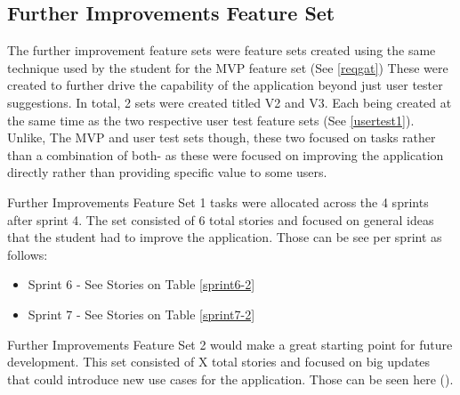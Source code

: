 \subsection{Further Improvements Feature Set}
The further improvement feature sets were feature sets created using the same technique used by the student for the MVP feature set (See \ref{reqgat}) These were created to further drive the capability of the application beyond just user tester suggestions. In total, 2 sets were created titled V2 and V3. Each being created at the same time as the two respective user test feature sets (See \ref{usertest1}). Unlike, The MVP and user test sets though, these two focused on tasks rather than a combination of both- as these were focused on improving the application directly rather than providing specific value to some users.

Further Improvements Feature Set 1 tasks were allocated across the 4 sprints after sprint 4. The set consisted of 6 total stories and focused on general ideas that the student had to improve the application. Those can be see per sprint as follows:

\begin{itemize}
    \item Sprint 6 - See Stories on Table \ref{sprint6-2}
    \item Sprint 7 - See Stories on Table \ref{sprint7-2}
\end{itemize}

Further Improvements Feature Set 2 would make a great starting point for future development. This set consisted of X total stories and focused on big updates that could introduce new use cases for the application. Those can be seen here ().